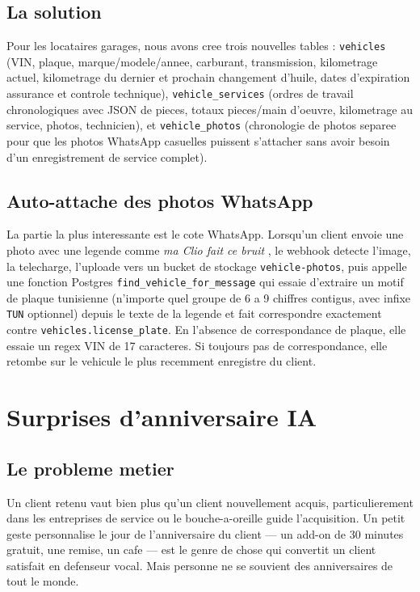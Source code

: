 \subsection{La solution}
Pour les locataires garages, nous avons cree trois nouvelles tables :
\texttt{vehicles} (VIN, plaque, marque/modele/annee, carburant,
transmission, kilometrage actuel, kilometrage du dernier et prochain
changement d'huile, dates d'expiration assurance et controle
technique), \texttt{vehicle\_services} (ordres de travail
chronologiques avec JSON de pieces, totaux pieces/main d'oeuvre,
kilometrage au service, photos, technicien), et
\texttt{vehicle\_photos} (chronologie de photos separee pour que les
photos WhatsApp casuelles puissent s'attacher sans avoir besoin d'un
enregistrement de service complet).

\subsection{Auto-attache des photos WhatsApp}
La partie la plus interessante est le cote WhatsApp. Lorsqu'un client
envoie une photo avec une legende comme \emph{\og ma Clio fait ce
bruit \fg{}}, le webhook detecte l'image, la telecharge, l'uploade
vers un bucket de stockage \texttt{vehicle-photos}, puis appelle une
fonction Postgres \texttt{find\_vehicle\_for\_message} qui essaie
d'extraire un motif de plaque tunisienne (n'importe quel groupe de 6 a
9 chiffres contigus, avec infixe \texttt{TUN} optionnel) depuis le
texte de la legende et fait correspondre exactement contre
\texttt{vehicles.license\_plate}. En l'absence de correspondance de
plaque, elle essaie un regex VIN de 17 caracteres. Si toujours pas de
correspondance, elle retombe sur le vehicule le plus recemment
enregistre du client.

\section{Surprises d'anniversaire IA}

\subsection{Le probleme metier}
Un client retenu vaut bien plus qu'un client nouvellement acquis,
particulierement dans les entreprises de service ou le bouche-a-oreille
guide l'acquisition. Un petit geste personnalise le jour de
l'anniversaire du client --- un add-on de 30 minutes gratuit, une
remise, un cafe --- est le genre de chose qui convertit un client
satisfait en defenseur vocal. Mais personne ne se souvient des
anniversaires de tout le monde.

